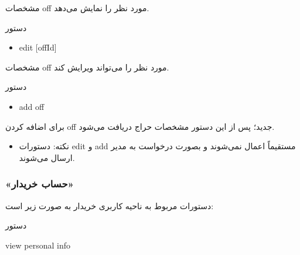 \documentclass[]{article}
\begin{document}
مشخصات off مورد نظر را نمایش می‌دهد.



\begin{mybox}[colback=brilliantlavender]{دستور}

\begin{latin}

\begin{itemize}[label = {$\Rightarrow$}]

\item
edit [offId]

\end{itemize}

\end{latin}

\end{mybox}

مشخصات off مورد نظر را می‌تواند ویرایش کند.


\begin{mybox}[colback=brilliantlavender]{دستور}

\begin{latin}

\begin{itemize}[label = {$\Rightarrow$}]

\item
add off

\end{itemize}

\end{latin}

\end{mybox}

برای اضافه کردن off جدید؛ پس از این دستور مشخصات حراج دریافت می‌شود.

\begin{itemize}[label={$\blacksquare$}]
\item
نکته: دستورات edit و add مستقیماً اعمال نمی‌شوند و بصورت درخواست به مدیر ارسال می‌شوند.

\end{itemize}

\newpage

\subsubsection*{{\titr «حساب خریدار»}}

دستورات مربوط به ناحیه کاربری خریدار به صورت زیر است:


\begin{mybox}[colback=yellow]{دستور}

\begin{latin}

view personal info

\end{latin}

\end{mybox}
\end{document}

